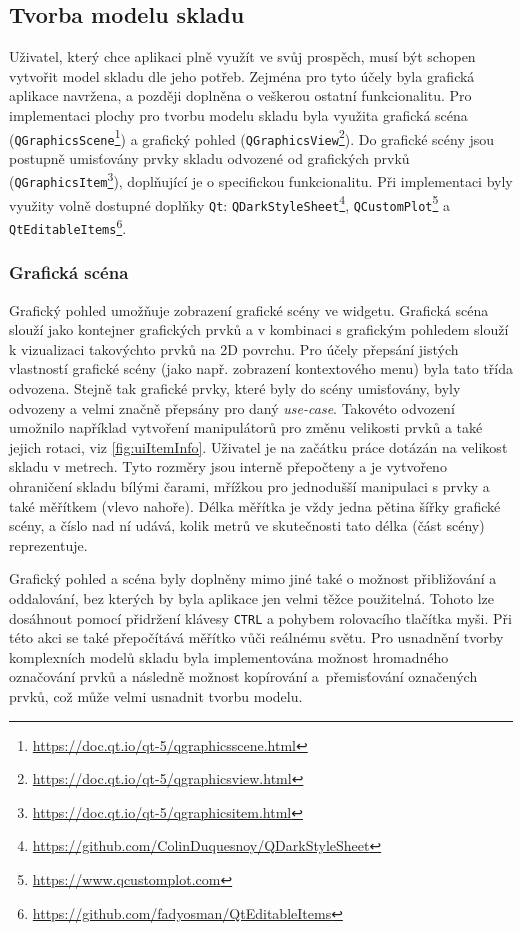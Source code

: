 \subsection{Tvorba modelu skladu}
\label{sec:uiModelSkladu}
Uživatel, který chce aplikaci plně využít ve svůj prospěch, musí být schopen vytvořit model skladu dle jeho potřeb. Zejména pro tyto účely byla grafická aplikace navržena, a později doplněna o veškerou ostatní funkcionalitu. Pro implementaci plochy pro tvorbu modelu skladu byla využita grafická scéna (\texttt{QGraphicsScene}\footnote{\url{https://doc.qt.io/qt-5/qgraphicsscene.html}}) a grafický pohled (\texttt{QGraphicsView}\footnote{\url{https://doc.qt.io/qt-5/qgraphicsview.html}}). Do grafické scény jsou postupně umisťovány prvky skladu odvozené od grafických prvků (\texttt{QGraphicsItem}\footnote{\url{https://doc.qt.io/qt-5/qgraphicsitem.html}}), doplňující je o specifickou funkcionalitu. Při implementaci byly využity volně dostupné doplňky \texttt{Qt}: \texttt{QDarkStyleSheet}\footnote{\url{https://github.com/ColinDuquesnoy/QDarkStyleSheet}}, \texttt{QCustomPlot}\footnote{\url{https://www.qcustomplot.com}} a \texttt{QtEditableItems}\footnote{\url{https://github.com/fadyosman/QtEditableItems}}.

\subsubsection{Grafická scéna}
Grafický pohled umožňuje zobrazení grafické scény ve widgetu. Grafická scéna slouží jako kontejner grafických prvků a v kombinaci s grafickým pohledem slouží k vizualizaci takovýchto prvků na 2D povrchu. Pro účely přepsání jistých vlastností grafické scény (jako např. zobrazení kontextového menu) byla tato třída odvozena. Stejně tak grafické prvky, které byly do scény umisťovány, byly odvozeny a velmi značně přepsány pro daný \emph{use-case}. Takovéto odvození umožnilo například vytvoření manipulátorů pro změnu velikosti prvků a také jejich rotaci, viz \ref{fig:uiItemInfo}. Uživatel je na začátku práce dotázán na velikost skladu v metrech. Tyto rozměry jsou interně přepočteny a je vytvořeno ohraničení skladu bílými čarami, mřížkou pro jednodušší manipulaci s prvky a také měřítkem (vlevo nahoře). Délka měřítka je vždy jedna pětina šířky grafické scény, a číslo nad ní udává, kolik metrů ve skutečnosti tato délka (část scény) reprezentuje.

Grafický pohled a scéna byly doplněny mimo jiné také o možnost přibližování a oddalování, bez kterých by byla aplikace jen velmi těžce použitelná. Tohoto lze dosáhnout pomocí přidržení klávesy \texttt{CTRL} a pohybem rolovacího tlačítka myši. Při této akci se také přepočítává měřítko vůči reálnému světu. Pro usnadnění tvorby komplexních modelů skladu byla implementována možnost hromadného označování prvků a následně možnost kopírování a~přemisťování označených prvků, což může velmi usnadnit tvorbu modelu.

